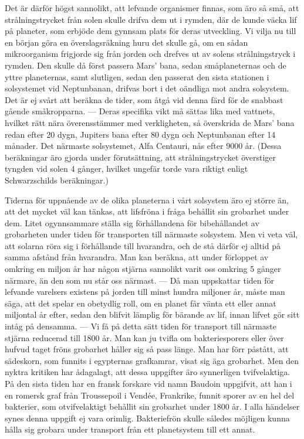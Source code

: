 \documentclass[a4paper, 12pt, oneside, swedish]{article}
\begin{document}
Det är därför högst sannolikt, att lefvande organismer finnas, som äro så små, att strålningstrycket från solen skulle drifva dem ut i rymden, där de kunde väcka lif på planeter, som erbjöde dem gynnsam plats för deras utveckling. Vi vilja nu till en början göra en överslagsräkning huru det skulle gå, om en sådan mikroorganism frigjorde sig från jorden och drefves ut av solens strålningstryck i rymden. Den skulle då först passera Mars' bana, sedan småplaneternas och de yttre planeternas, samt slutligen, sedan den passerat den sista stationen i solsystemet vid Neptunbanan, drifvas bort i det oändliga mot andra solsystem. Det är ej svårt att beräkna de tider, som åtgå vid denna färd för de snabbast gående småkropparna. --- Deras specifika vikt må sättas lika med vattnets, hvilket rätt nära överensstämmer med verkligheten, så överskrida de Mars' bana redan efter 20 dygn, Jupiters bana efter 80 dygn och Neptunbanan efter 14 månader. Det närmaste solsystemet, Alfa Centauri, nås efter 9000 år. (Dessa beräkningar äro gjorda under förutsättning, att strålningstrycket överstiger tyngden vid solen 4 gånger, hvilket ungefär torde vara riktigt enligt Schwarzschilds beräkningar.)

Tiderna för uppnående av de olika planeterna i vårt solsystem äro ej större än, att det mycket väl kan tänkas, att lifsfröna i fråga behållit sin grobarhet under dem. Litet ogynnsammare ställa sig förhållandena för bibehållandet av grobarheten under tiden för transporten till närmaste solsystem. Men vi veta väl, att solarna röra sig i förhållande till hvarandra, och de stå därför ej alltid på samma afstånd från hvarandra. Man kan beräkna, att under förloppet av omkring en miljon år har någon stjärna sannolikt varit oss omkring 5 gånger närmare, än den som nu står oss närmast. --- Då man uppskattar tiden för lefvande varelsers existens på jorden till minst hundra miljoner år, måste man säga, att det spelar en obetydlig roll, om en planet får vänta ett eller annat miljontal år efter, sedan den blifvit lämplig för bärande av lif, innan lifvet gör sitt intåg på densamma. --- Vi få på detta sätt tiden för transport till närmaste stjärna reducerad till 1800 år. Man kan ju tvifla om bakteriesporers eller över hufvud taget fröns grobarhet håller sig så pass länge. Man har förr påstått, att sädeskorn, som funnits i egypternas grafkamrar, visat sig äga grobarhet. Men den nyktra kritiken har ådagalagt, att dessa uppgifter äro synnerligen tvifvelaktiga. På den sista tiden har en fransk forskare vid namn Baudoin uppgifvit, att han i en romersk graf från Troussepoil i Vendée, Frankrike, funnit sporer av en hel del bakterier, som otvifvelaktigt behållit sin grobarhet under 1800 år. I alla händelser synes denna uppgift ej vara orimlig. Bakteriefrön skulle således möjligen kunna hålla sig grobara under transport från ett planetsystem till ett annat.
\end{document}
